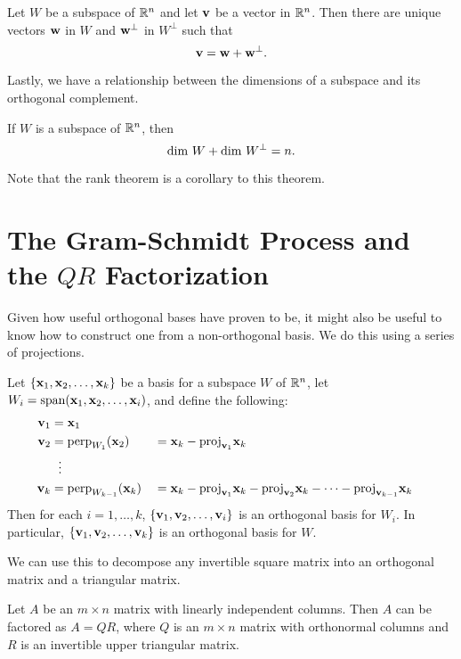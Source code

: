\documentclass[../m73main.tex]{subfiles}
\begin{document}
\begin{theorem}
	Let $W$ be a subspace of $\mathbb{R}^n$ and let $\mathbf{v}$ be a vector in $\mathbb{R}^n$.
	Then there are unique vectors $\mathbf{w}$ in $W$ and $\mathbf{w}^\perp$ in $W^\perp$ such that
	\[ \mathbf{v} = \mathbf{w} + \mathbf{w}^\perp. \]
\end{theorem}

Lastly, we have a relationship between the dimensions of a subspace and its orthogonal complement.

\begin{theorem}
	If $W$ is a subspace of $\mathbb{R}^n$, then
	\[ \textrm{dim } W + \textrm{dim } W^\perp = n. \]
\end{theorem}

Note that the rank theorem is a corollary to this theorem.

\section{The Gram-Schmidt Process and the $QR$ Factorization}
Given how useful orthogonal bases have proven to be, it might also be useful to know how to construct one from a non-orthogonal basis.
We do this using a series of projections.

\begin{theorem}
	Let $\{\mathbf{x}_1, \mathbf{x}_2, \ldots, \mathbf{x}_k\}$ be a basis for a subspace $W$ of $\mathbb{R}^n$, let $W_i = \textrm{span}(\mathbf{x}_1, \mathbf{x}_2, \ldots, \mathbf{x}_i)$, and define the following:
	\begin{alignat*}{2}
		\mathbf{v}_1 &= \mathbf{x}_1 \\
		\mathbf{v}_2 &= \textrm{perp}_{W_1}(\mathbf{x}_2) &&= \mathbf{x}_k - \textrm{proj}_{\mathbf{v}_1}\mathbf{x}_k \\
		&\phantom{~!}\vdots \\
		\mathbf{v}_k &= \textrm{perp}_{W_{k-1}}(\mathbf{x}_k) &&= \mathbf{x}_k - \textrm{proj}_{\mathbf{v}_1}\mathbf{x}_k - \textrm{proj}_{\mathbf{v}_2}\mathbf{x}_k - \cdots - \textrm{proj}_{\mathbf{v}_{k-1}}\mathbf{x}_k
	\end{alignat*}
	Then for each $i = 1, \ldots, k$, $\{\mathbf{v}_1, \mathbf{v}_2, \ldots, \mathbf{v}_i\}$ is an orthogonal basis for $W_i$.
	In particular, $\{\mathbf{v}_1, \mathbf{v}_2, \ldots, \mathbf{v}_k\}$ is an orthogonal basis for $W$.
\end{theorem}

We can use this to decompose any invertible square matrix into an orthogonal matrix and a triangular matrix.

\begin{theorem}[$QR$ factorization]
	Let $A$ be an $m \times n$ matrix with linearly independent columns.
	Then $A$ can be factored as $A = QR$, where $Q$ is an $m \times n$ matrix with orthonormal columns and $R$ is an invertible upper triangular matrix.
\end{theorem}
\end{document}

